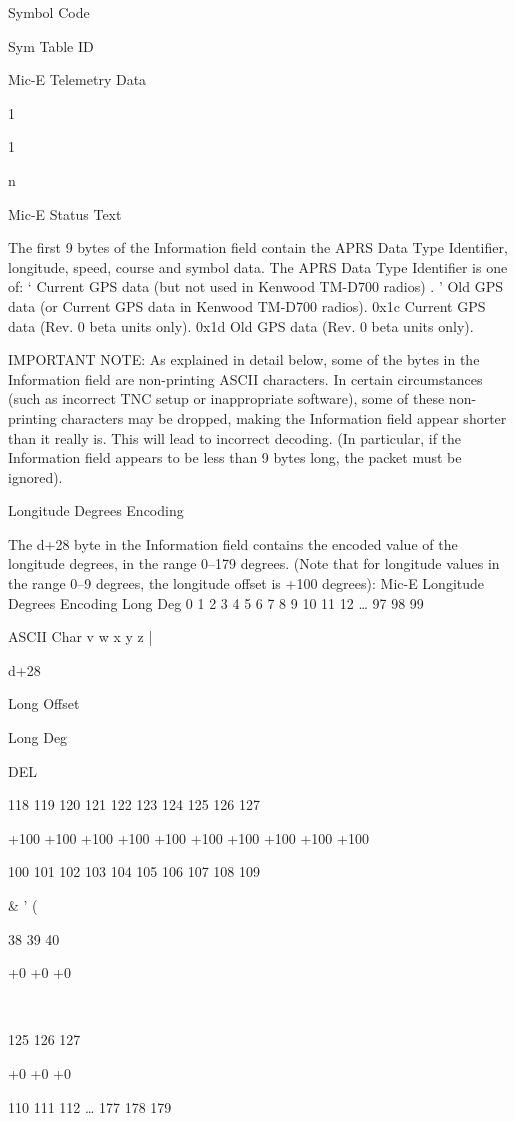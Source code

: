 {{{{{Symbol
Code

Sym
Table
ID

Mic-E Telemetry Data

1

1

n

Mic-E Status Text

The first 9 bytes of the Information field contain the APRS Data Type
Identifier, longitude, speed, course and symbol data.
The APRS Data Type Identifier is one of:
‘
Current GPS data
(but not used in Kenwood TM-D700 radios) .
'
Old GPS data
(or Current GPS data in Kenwood TM-D700 radios).
0x1c Current GPS data (Rev. 0 beta units only).
0x1d Old GPS data (Rev. 0 beta units only).



IMPORTANT NOTE: As explained in detail below, some of the bytes in
the Information field are non-printing ASCII characters. In certain
circumstances (such as incorrect TNC setup or inappropriate software), some
of these non-printing characters may be dropped, making the Information
field appear shorter than it really is. This will lead to incorrect decoding. (In
particular, if the Information field appears to be less than 9 bytes long, the
packet must be ignored).

Longitude Degrees
Encoding

The d+28 byte in the Information field contains the encoded value of the
longitude degrees, in the range 0–179 degrees.
(Note that for longitude values in the range 0–9 degrees, the longitude offset
is +100 degrees):
Mic-E Longitude Degrees Encoding
Long
Deg
0
1
2
3
4
5
6
7
8
9
10
11
12
…
97
98
99

ASCII
Char
v
w
x
y
z
{
|
}
~

d+28

Long
Offset

Long
Deg

DEL

118
119
120
121
122
123
124
125
126
127

+100
+100
+100
+100
+100
+100
+100
+100
+100
+100

100
101
102
103
104
105
106
107
108
109

&
'
(

38
39
40

+0
+0
+0

}
~

125
126
127

+0
+0
+0

110
111
112
…
177
178
179

}}}}

